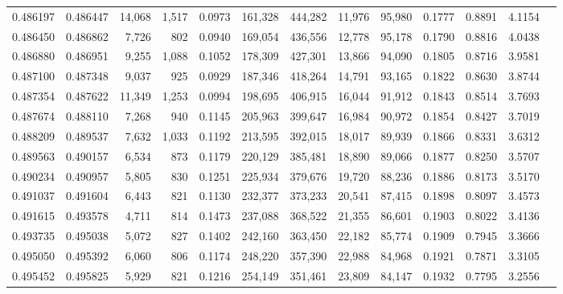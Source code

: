\begin{tabular}{rrrrrrrrrrrrr}
0.486197 & 0.486447 & 14,068 & 1,517 &                                     0.0973 & 161,328 & 444,282 &  11,976 &  95,980 & 0.1777 & 0.8891 & 4.1154 \\
0.486450 & 0.486862 &  7,726 &   802 &                                     0.0940 & 169,054 & 436,556 &  12,778 &  95,178 & 0.1790 & 0.8816 & 4.0438 \\
0.486880 & 0.486951 &  9,255 & 1,088 &                                     0.1052 & 178,309 & 427,301 &  13,866 &  94,090 & 0.1805 & 0.8716 & 3.9581 \\
0.487100 & 0.487348 &  9,037 &   925 &                                     0.0929 & 187,346 & 418,264 &  14,791 &  93,165 & 0.1822 & 0.8630 & 3.8744 \\
0.487354 & 0.487622 & 11,349 & 1,253 &                                     0.0994 & 198,695 & 406,915 &  16,044 &  91,912 & 0.1843 & 0.8514 & 3.7693 \\
0.487674 & 0.488110 &  7,268 &   940 &                                     0.1145 & 205,963 & 399,647 &  16,984 &  90,972 & 0.1854 & 0.8427 & 3.7019 \\
0.488209 & 0.489537 &  7,632 & 1,033 &                                     0.1192 & 213,595 & 392,015 &  18,017 &  89,939 & 0.1866 & 0.8331 & 3.6312 \\
0.489563 & 0.490157 &  6,534 &   873 &                                     0.1179 & 220,129 & 385,481 &  18,890 &  89,066 & 0.1877 & 0.8250 & 3.5707 \\
0.490234 & 0.490957 &  5,805 &   830 &                                     0.1251 & 225,934 & 379,676 &  19,720 &  88,236 & 0.1886 & 0.8173 & 3.5170 \\
0.491037 & 0.491604 &  6,443 &   821 &                                     0.1130 & 232,377 & 373,233 &  20,541 &  87,415 & 0.1898 & 0.8097 & 3.4573 \\
0.491615 & 0.493578 &  4,711 &   814 &                                     0.1473 & 237,088 & 368,522 &  21,355 &  86,601 & 0.1903 & 0.8022 & 3.4136 \\
0.493735 & 0.495038 &  5,072 &   827 &                                     0.1402 & 242,160 & 363,450 &  22,182 &  85,774 & 0.1909 & 0.7945 & 3.3666 \\
0.495050 & 0.495392 &  6,060 &   806 &                                     0.1174 & 248,220 & 357,390 &  22,988 &  84,968 & 0.1921 & 0.7871 & 3.3105 \\
0.495452 & 0.495825 &  5,929 &   821 &                                     0.1216 & 254,149 & 351,461 &  23,809 &  84,147 & 0.1932 & 0.7795 & 3.2556 \\

\end{tabular}
